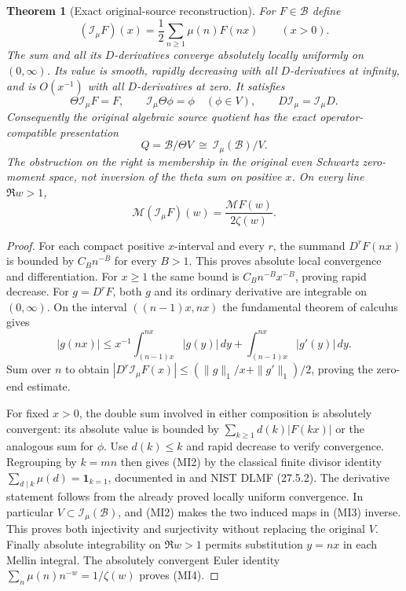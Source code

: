 \documentclass[11pt]{article}
\newtheorem{theorem}{Theorem}[section]
\newcommand{\B}{\mathscr B}\newcommand{\M}{\mathcal M}
\begin{document}
\begin{theorem}[Exact original-source reconstruction]
For $F\in\B$ define
\[
 (\mathcal I_\mu F)(x)=\frac12\sum_{n\geq1}\mu(n)F(nx)
       \qquad(x>0).\tag{MI1}
\]
The sum and all its $D$-derivatives converge absolutely locally
uniformly on $(0,\infty)$. Its value is smooth, rapidly decreasing
with all $D$-derivatives at infinity, and is $O(x^{-1})$ with all
$D$-derivatives at zero. It satisfies
\[
 \Theta\mathcal I_\mu F=F,\qquad
 \mathcal I_\mu\Theta\phi=\phi\quad(\phi\in V),\qquad
 D\mathcal I_\mu=\mathcal I_\mu D.
 \tag{MI2}
\]
Consequently the original algebraic source quotient has the exact
operator-compatible presentation
\[
 \boxed{\quad Q=\B/\Theta V\ \cong\ \mathcal I_\mu(\B)/V.\quad}
 \tag{MI3}
\]
The obstruction on the right is membership in the original even
Schwartz zero-moment space, not inversion of the theta sum on positive
$x$. On every line $\Re w>1$,
\[
 \mathcal M(\mathcal I_\mu F)(w)
       =\frac{\mathcal MF(w)}{2\zeta(w)}.
 \tag{MI4}
\]
\end{theorem}
\begin{proof}
For each compact positive $x$-interval and every $r$, the summand
$D^rF(nx)$ is bounded by $C_B n^{-B}$ for every $B>1$. This proves
absolute local convergence and differentiation. For $x\geq1$ the
same bound is $C_B n^{-B}x^{-B}$, proving rapid decrease.
For $g=D^rF$, both $g$ and its ordinary derivative are integrable
on $(0,\infty)$. On the interval $((n-1)x,nx)$ the fundamental
theorem of calculus gives
\[
 |g(nx)|\leq x^{-1}\int_{(n-1)x}^{nx}|g(y)|\,dy
                 +\int_{(n-1)x}^{nx}|g'(y)|\,dy.
\]
Sum over $n$ to obtain
$|D^r\mathcal I_\mu F(x)|\leq
 (\|g\|_1/x+\|g'\|_1)/2$, proving the zero-end estimate.

For fixed $x>0$, the double sum involved in either composition is
absolutely convergent: its absolute value is bounded by
$\sum_{k\geq1}d(k)|F(kx)|$ or the analogous sum for $\phi$.
Use $d(k)\leq k$ and rapid decrease to verify convergence.
Regrouping by $k=mn$ then gives (MI2) by the classical finite divisor
identity $\sum_{d\mid k}\mu(d)=\mathbf1_{k=1}$, documented in
\cite[Chapter 2]{ApostolMobius} and NIST DLMF (27.5.2).
The derivative statement follows from the already proved locally
uniform convergence. In particular $V\subset\mathcal I_\mu(\B)$,
and (MI2) makes the two induced maps in (MI3) inverse. This proves
both injectivity and surjectivity without replacing the original $V$.
Finally absolute integrability on $\Re w>1$ permits substitution
$y=nx$ in each Mellin integral. The absolutely convergent Euler
identity $\sum_n\mu(n)n^{-w}=1/\zeta(w)$ proves (MI4).
\end{proof}
\end{document}
